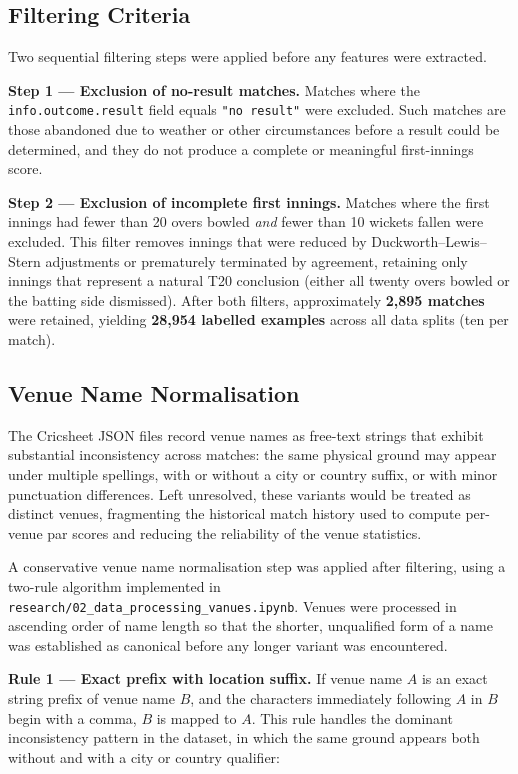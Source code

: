 \subsection{Filtering Criteria}

Two sequential filtering steps were applied before any features were extracted.

\textbf{Step 1 — Exclusion of no-result matches.} Matches where the \texttt{info.outcome.result} field equals \texttt{"no result"} were excluded. Such matches are those abandoned due to weather or other circumstances before a result could be determined, and they do not produce a complete or meaningful first-innings score.

\textbf{Step 2 — Exclusion of incomplete first innings.} Matches where the first innings had fewer than 20 overs bowled \textit{and} fewer than 10 wickets fallen were excluded. This filter removes innings that were reduced by Duckworth--Lewis--Stern adjustments or prematurely terminated by agreement, retaining only innings that represent a natural T20 conclusion (either all twenty overs bowled or the batting side dismissed). After both filters, approximately \textbf{2,895 matches} were retained, yielding \textbf{28,954 labelled examples} across all data splits (ten per match).
\subsection{Venue Name Normalisation}

The Cricsheet JSON files record venue names as free-text strings that exhibit substantial inconsistency across matches: the same physical ground may appear under multiple spellings, with or without a city or country suffix, or with minor punctuation differences. Left unresolved, these variants would be treated as distinct venues, fragmenting the historical match history used to compute per-venue par scores and reducing the reliability of the venue statistics.

A conservative venue name normalisation step was applied after filtering, using a two-rule algorithm implemented in \texttt{research/02\_data\_processing\_vanues.ipynb}. Venues were processed in ascending order of name length so that the shorter, unqualified form of a name was established as canonical before any longer variant was encountered.

\textbf{Rule 1 --- Exact prefix with location suffix.} If venue name $A$ is an exact string prefix of venue name $B$, and the characters immediately following $A$ in $B$ begin with a comma, $B$ is mapped to $A$. This rule handles the dominant inconsistency pattern in the dataset, in which the same ground appears both without and with a city or country qualifier:

